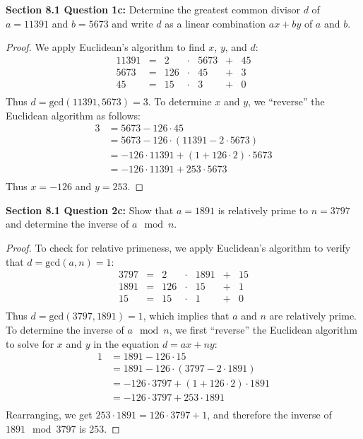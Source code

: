 \documentclass{article}
\begin{document}
\textbf{Section 8.1 Question 1c:} Determine the greatest common divisor $d$
  of $a=11391$ and $b=5673$ and write $d$ as a linear combination $ax+by$
  of $a$ and $b$.
  \begin{proof}
    We apply Euclidean's algorithm to find $x$, $y$, and $d$:
    \[\begin{array}{rcrcrcr}
      11391 &= &2   &\cdot &5673 &+ &45 \\
      5673  &= &126 &\cdot &45   &+ &3 \\
      45    &= &15  &\cdot &3    &+ &0 \\
    \end{array}\]
    Thus $d=\text{gcd}(11391,5673)=3$. To determine $x$ and $y$, we
    ``reverse'' the Euclidean algorithm as follows:
    \begin{align*}
      3 &=5673-126\cdot45 \\
        &=5673-126\cdot(11391-2\cdot5673) \\
        &=-126\cdot11391+(1+126\cdot2)\cdot5673 \\
        &=-126\cdot11391+253\cdot5673 \\
    \end{align*}
    Thus $x=-126$ and $y=253$.
  \end{proof}

\textbf{Section 8.1 Question 2c:} Show that $a=1891$ is relatively prime to
  $n=3797$ and determine the inverse of $a\mod{n}$.
  \begin{proof}
    To check for relative primeness, we apply Euclidean's algorithm to
    verify that $d=\text{gcd}(a,n)=1$:
    \[\begin{array}{rcrcrcr}
      3797 &= &2   &\cdot &1891 &+ &15 \\
      1891 &= &126 &\cdot &15   &+ &1 \\
      15   &= &15  &\cdot &1    &+ &0 \\
    \end{array}\]
    Thus $d=\text{gcd}(3797,1891)=1$, which implies that $a$ and $n$ are
    relatively prime. To determine the inverse of $a\mod{n}$, we first
    ``reverse'' the Euclidean algorithm to solve for $x$ and $y$ in the
    equation $d=ax+ny$:
    \begin{align*}
      1 &=1891-126\cdot15 \\
        &=1891-126\cdot(3797-2\cdot1891) \\
        &=-126\cdot3797+(1+126\cdot2)\cdot1891 \\
        &=-126\cdot3797+253\cdot1891 \\
    \end{align*}
    Rearranging, we get $253\cdot1891=126\cdot3797+1$, and therefore the
    inverse of $1891\mod{3797}$ is $253$.
  \end{proof}
\end{document}

